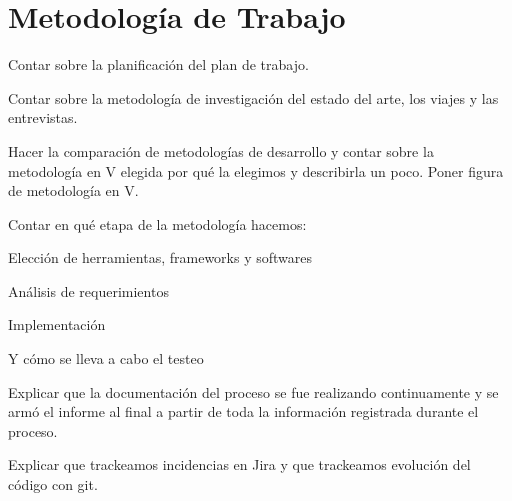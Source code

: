 \chapter[Metodología de Trabajo]{Metodología de Trabajo}
\label{cp:methodology}

\parindent0pt

Contar sobre la planificación del plan de trabajo.

Contar sobre la metodología de investigación del estado del arte, los viajes y las entrevistas.

Hacer la comparación de metodologías de desarrollo y contar sobre la metodología en V elegida por qué la elegimos y describirla un poco. Poner figura de metodología en V.

Contar en qué etapa de la metodología hacemos:

Elección de herramientas, frameworks y softwares

Análisis de requerimientos

Implementación

Y cómo se lleva a cabo el testeo

Explicar que la documentación del proceso se fue realizando continuamente y se armó el informe al final a partir de toda la información registrada durante el proceso.

Explicar que trackeamos incidencias en Jira y que trackeamos evolución del código con git.
